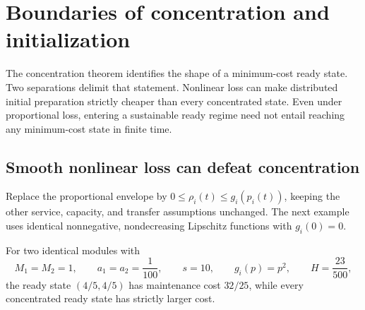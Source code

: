 \section{Boundaries of concentration and initialization}
\label{sec:boundaries}

The concentration theorem identifies the shape of a minimum-cost ready
state. Two separations delimit that statement. Nonlinear loss can make
distributed initial preparation strictly cheaper than every concentrated
state. Even under proportional loss, entering a sustainable ready regime
need not entail reaching any minimum-cost state in finite time.

\subsection{Smooth nonlinear loss can defeat concentration}
\label{sec:nonlinear-boundary}

Replace the proportional envelope by
$0\leq\rho_i(t)\leq g_i(p_i(t))$, keeping the other service, capacity,
and transfer assumptions unchanged. The next example uses identical
nonnegative, nondecreasing Lipschitz functions with $g_i(0)=0$.

\begin{proposition}
\label{prop:quadratic-failure}
For two identical modules with
\[
 M_1=M_2=1,\qquad a_1=a_2=\frac1{100},\qquad s=10,
 \qquad g_i(p)=p^2,\qquad H=\frac{23}{500},
\]
the ready state $(4/5,4/5)$ has maintenance cost $32/25$, while every
concentrated ready state has strictly larger cost.
\end{proposition}

